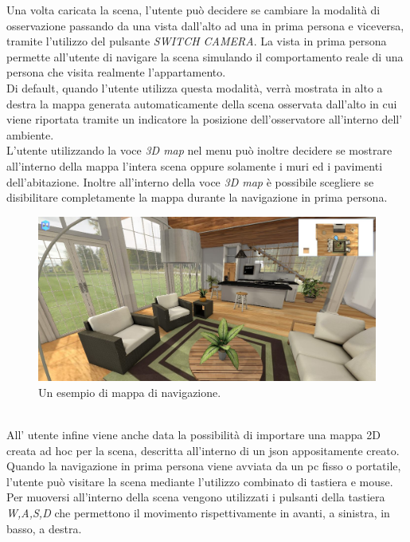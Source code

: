 Una volta caricata la scena, l’utente può decidere se cambiare la modalità di osservazione passando da una vista dall’alto ad una in prima persona e viceversa, tramite l’utilizzo del pulsante \emph{SWITCH CAMERA}.
La vista in prima persona permette all’utente di navigare la scena simulando il comportamento  reale di una persona che visita realmente l’appartamento.
\\
Di default, quando l’utente utilizza questa modalità, verrà mostrata in alto a destra la mappa generata automaticamente della scena osservata  dall’alto in cui viene riportata tramite un indicatore la posizione dell’osservatore all’interno dell’ ambiente.
\\
L’utente utilizzando la voce \emph{3D map} nel menu può inoltre decidere se mostrare all’interno della mappa l’intera scena oppure solamente i muri ed i pavimenti dell’abitazione.
Inoltre all’interno della voce \emph{3D map} è possibile scegliere se disibilitare completamente la mappa durante la navigazione in prima persona.
\\
\begin{figure}[htb]
 \centering
 \includegraphics[width=1\linewidth]{images/chapter_caso_uso/caso_uso_navigator.jpg}\hfill
 \caption[Esempio di mappa di navigazione]{Un esempio di mappa di navigazione.}
 \label{fig:caso_uso_vista_alto}
\end{figure}
\\
All’ utente infine viene anche data la possibilità di importare una mappa 2D creata ad hoc per la scena, descritta all’interno di un json appositamente creato.
\\
Quando la navigazione in prima persona viene avviata da un pc fisso o portatile,  l’utente può visitare la scena mediante l’utilizzo combinato di tastiera e mouse.
Per muoversi all’interno della scena vengono utilizzati i pulsanti della tastiera \emph{W,A,S,D} che permettono il movimento rispettivamente in avanti, a sinistra, in basso, a destra.

